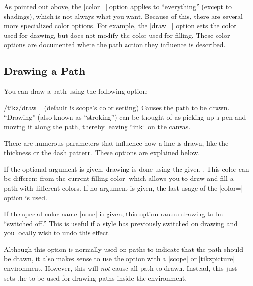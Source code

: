 As pointed out above, the |color=| option applies to ``everything''
(except to shadings), which is not always what you want. Because of
this, there are several more specialized color options. For example,
the |draw=| option sets the color used for drawing, but does not
modify the color used for filling. These color options are documented
where the path action they influence is described.


\subsection{Drawing a Path}

You can draw a path using the following option:
\begin{key}{/tikz/draw= (default \normalfont is scope's color setting)}
  Causes the path to be drawn. ``Drawing'' (also known as
  ``stroking'') can be thought of as picking up a pen and moving it
  along the path, thereby leaving ``ink'' on the canvas.

  There are numerous parameters that influence how a line is drawn,
  like the thickness or the dash pattern. These options are explained
  below.

  If the optional  argument is given, drawing is done
  using the given . This color can be different from the
  current filling color, which allows you to draw and fill a path with
  different colors. If no  argument is given, the last
  usage of the |color=| option is used.

  If the special color name |none| is given, this option causes
  drawing to be ``switched off.'' This is useful if a style has
  previously switched on drawing and you locally wish to undo this
  effect. 

  Although this option is normally used on paths to indicate that the
  path should be drawn, it also makes sense to use the option with a
  |{scope}| or |{tikzpicture}| environment. However, this will
  \emph{not} cause all path to drawn. Instead, this just sets the
   to be used for drawing paths inside the environment.

\begin{codeexample}[]
\end{codeexample}
\end{key}


